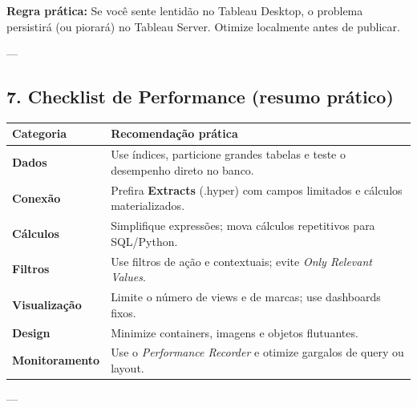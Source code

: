 \begin{NoteBox}
\textbf{Regra prática:}  
Se você sente lentidão no Tableau Desktop, o problema persistirá (ou piorará) no Tableau Server.  
Otimize localmente antes de publicar.
\end{NoteBox}

---

\subsection{7. Checklist de Performance (resumo prático)}

\begin{longtable}{p{4cm}p{10cm}}
\toprule
\textbf{Categoria} & \textbf{Recomendação prática} \\ \midrule
\textbf{Dados} & Use índices, particione grandes tabelas e teste o desempenho direto no banco. \\
\textbf{Conexão} & Prefira \textbf{Extracts} (.hyper) com campos limitados e cálculos materializados. \\
\textbf{Cálculos} & Simplifique expressões; mova cálculos repetitivos para SQL/Python. \\
\textbf{Filtros} & Use filtros de ação e contextuais; evite \textit{Only Relevant Values}. \\
\textbf{Visualização} & Limite o número de views e de marcas; use dashboards fixos. \\
\textbf{Design} & Minimize containers, imagens e objetos flutuantes. \\
\textbf{Monitoramento} & Use o \textit{Performance Recorder} e otimize gargalos de query ou layout. \\
\bottomrule
\end{longtable}

---

